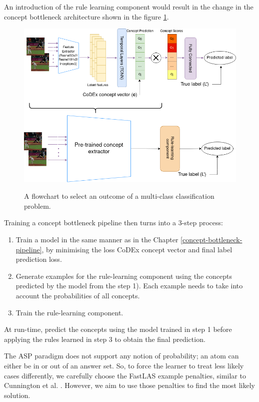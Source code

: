 An introduction of the rule learning component would result in the change in the concept bottleneck architecture shown in the figure \ref{logic-based-concept-bottleneck}.
\begin{figure}[h]
\caption{A flowchart to select an outcome of a multi-class classification problem.}
\vspace{10pt}
\centering
\includegraphics[width=\textwidth]{logic-based-classification/logic-based-classification-architecture.png}
\label{logic-based-concept-bottleneck}
\end{figure}

Training a concept bottleneck pipeline then turns into a 3-step process:
\begin{enumerate}
    \item Train a model in the same manner as in the Chapter \ref{concept-bottleneck-pipeline}, by minimising the loss CoDEx concept vector and final label prediction loss.
    \item Generate examples for the rule-learning component using the concepts predicted by the model from the step 1). Each example needs to take into account the probabilities of all concepts.
    \item Train the rule-learning component.
\end{enumerate}

At run-time, predict the concepts using the model trained in step 1 before applying the rules learned in step 3 to obtain the final prediction.

The ASP paradigm does not support any notion of probability; an atom can either be in or out of an answer set. 
So, to force the learner to treat less likely cases differently, we carefully choose the FastLAS example penalties, similar to Cunnington et al. \cite{RefWorks:RefID:71-cunnington2021ff-nsl:}.
However, we aim to use those penalties to find the most likely solution.


